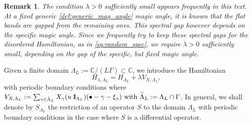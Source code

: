 \documentclass[reqno,12pt,letterpaper]{amsart}
\newcommand{\CC}{{\mathbb C}}
\newtheorem{rem}[theo]{Remark}
\numberwithin{equation}{section}
\def\indic{\operatorname{1\hskip-2.75pt\relax l}}
\begin{document}
{\begin{rem}
The condition $\lambda>0$ sufficiently small appears frequently in this text. At a fixed generic \ref{def:generic_mag_angle} magic angle, it is known that the flat bands are gapped from the remaining ones. This spectral gap however depends on the specific magic angle. Since we frequently try to keep these spectral gaps for the disordered Hamiltonian, as in \eqref{eq:random_spec}, we require $\lambda>0$ sufficiently small, depending on the gap of the specific, but fixed magic angle. 
\end{rem}}







Given a finite domain $\Lambda_L:=\CC/(L\Gamma) \subset \CC$, we introduce the Hamiltonian
\[ H_{\lambda, \Lambda_L} = H_{\Lambda_L}+\lambda V_{X,\Lambda_L},\]
with periodic boundary conditions where ${V_{X,\Lambda_L}}:=\sum_{\gamma \in \tilde \Lambda_L}X_{\gamma} (u\indic_{\Lambda_L})(\bullet-\gamma - \xi_{\gamma})\text{ with }\widetilde \Lambda_L:=\Lambda_L \cap \Gamma$. In general, we shall denote by $S_{\Lambda_L}$ the restriction of an operator $S$ to the domain $\Lambda_L$ with periodic boundary conditions in the case where $S$ is a differential operator.
\end{document}
